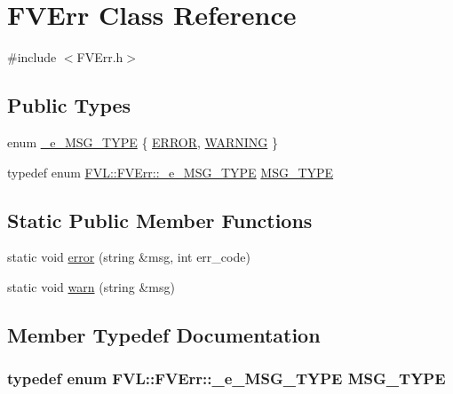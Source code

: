 \hypertarget{classFVL_1_1FVErr}{
\section{FVErr Class Reference}
\label{d9/d32/classFVL_1_1FVErr}
}


{\ttfamily \#include $<$FVErr.h$>$}

\subsection*{Public Types}
\begin{DoxyCompactItemize}
\item 
enum \hyperlink{classFVL_1_1FVErr_a90c00b2445d242b937377a2ffe6f5d71}{\_\-e\_\-MSG\_\-TYPE} \{ \hyperlink{classFVL_1_1FVErr_a90c00b2445d242b937377a2ffe6f5d71a2fd6f336d08340583bd620a7f5694c90}{ERROR}, 
\hyperlink{classFVL_1_1FVErr_a90c00b2445d242b937377a2ffe6f5d71a984de77c680eaff141ec910e25568a81}{WARNING}
 \}
\item 
typedef enum \hyperlink{classFVL_1_1FVErr_a90c00b2445d242b937377a2ffe6f5d71}{FVL::FVErr::\_\-e\_\-MSG\_\-TYPE} \hyperlink{classFVL_1_1FVErr_aa9831691642306f54c392afb5661bedb}{MSG\_\-TYPE}
\end{DoxyCompactItemize}
\subsection*{Static Public Member Functions}
\begin{DoxyCompactItemize}
\item 
static void \hyperlink{classFVL_1_1FVErr_ad90ccb0330b3f3e29b0478629d0ffb61}{error} (string \&msg, int err\_\-code)
\item 
static void \hyperlink{classFVL_1_1FVErr_adee13e1f5721fbf8eedce9b081339ecf}{warn} (string \&msg)
\end{DoxyCompactItemize}


\subsection{Member Typedef Documentation}
\hypertarget{classFVL_1_1FVErr_aa9831691642306f54c392afb5661bedb}{
\subsubsection[{MSG\_\-TYPE}]{\setlength{\rightskip}{0pt plus 5cm}typedef enum {\bf FVL::FVErr::\_\-e\_\-MSG\_\-TYPE}  {\bf MSG\_\-TYPE}}}
\label{d9/d32/classFVL_1_1FVErr_aa9831691642306f54c392afb5661bedb}


